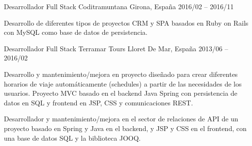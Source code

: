 \documentclass[]{awesome-cv}
\begin{document}
\begin{cventries}
	\cventry
	{Desarrollador Full Stack}
	{Coditramuntana}
	{Girona, España}
	{2016/02 – 2016/11}
	{\begin{cvitems}
		\vspace{0.5mm}
		\item {Desarrollo de diferentes tipos de proyectos CRM y SPA basados en Ruby on Rails con MySQL como base de datos de persistencia.}
		\end{cvitems}}


	\cventry
	{Desarrollador Full Stack}
	{Terramar Tours}
	{Lloret De Mar, España}
	{2013/06 – 2016/02}
	{\begin{cvitems}
		\vspace{0.5mm}
		\item {Desarrollo y mantenimiento/mejora en proyecto diseñado para crear diferentes horarios de viaje automáticamente (schedules) a partir de las necesidades de los usuarios. Proyecto MVC basado en el backend Java Spring con persistencia de datos en SQL y frontend en JSP, CSS y comunicaciones REST.}
  \item {Desarrollador y mantenimiento/mejora en el sector de relaciones de API de un proyecto basado en Spring y Java en el backend, y JSP y CSS en el frontend, con una base de datos SQL y la biblioteca JOOQ.}
		\end{cvitems}}
\end{cventries}
\end{document}
